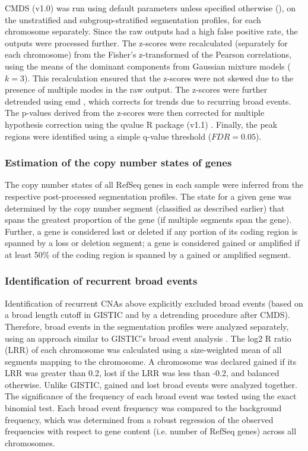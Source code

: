 CMDS (v1.0)  was run using default parameters unless specified otherwise (), on the unstratified and subgroup-stratified segmentation profiles, for each chromosome separately. Since the raw outputs had a high false positive rate, the outputs were processed further. The z-scores were recalculated (separately for each chromosome) from the Fisher’s z-transformed of the Pearson correlations, using the means of the dominant components from Gaussian mixture models ($k = 3$). This recalculation ensured that the z-scores were not skewed due to the presence of multiple modes in the raw output. The z-scores were further detrended using \gls{emd} , which corrects for trends due to recurring broad events. The p-values derived from the z-scores were then corrected for multiple hypothesis correction using the qvalue R package (v1.1) . Finally, the peak regions were identified using a simple q-value threshold ($FDR = 0.05$).

\subsubsection{Estimation of the copy number states of genes}

The copy number states of all RefSeq genes in each sample were inferred from the respective post-processed segmentation profiles. The state for a given gene was determined by the copy number segment (classified as described earlier) that spans the greatest proportion of the gene (if multiple segments span the gene). Further, a gene is considered lost or deleted if any portion of its coding region is spanned by a loss or deletion segment; a gene is considered gained or amplified if at least 50\% of the coding region is spanned by a gained or amplified segment.

\subsubsection{Identification of recurrent broad events}

Identification of recurrent CNAs above explicitly excluded broad events (based on a broad length cutoff in GISTIC and by a detrending procedure after CMDS). Therefore, broad events in the segmentation profiles were analyzed separately, using an approach similar to GISTIC's broad event analysis . The log2 R ratio (LRR) of each chromosome was calculated using a size-weighted mean of all segments mapping to the chromosome. A chromosome was declared gained if its LRR was greater than 0.2, lost if the LRR was less than -0.2, and balanced otherwise. Unlike GISTIC, gained and lost broad events were analyzed together. The significance of the frequency of each broad event was tested using the exact binomial test. Each broad event frequency was compared to the background frequency, which was determined from a robust regression of the observed frequencies with respect to gene content (i.e. number of RefSeq genes) across all chromosomes.

